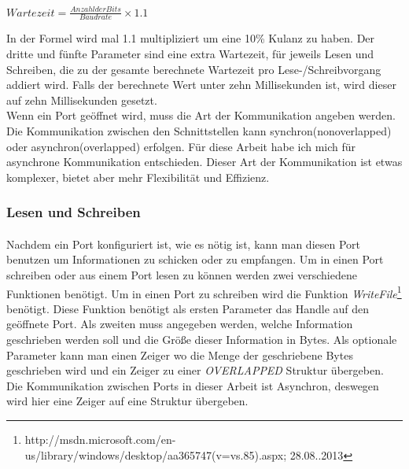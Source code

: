 \begin{center}
$ Wartezeit = \frac{Anzahl der Bits}{Baudrate} \times 1.1$
\end{center}

In der Formel wird mal 1.1 multipliziert um eine 10\% Kulanz zu haben. Der dritte und fünfte Parameter sind eine extra Wartezeit, für jeweils Lesen und Schreiben, die zu der gesamte berechnete Wartezeit pro Lese-/Schreibvorgang addiert wird. Falls der berechnete Wert unter zehn Millisekunden ist, wird dieser auf zehn Millisekunden gesetzt.
\\

Wenn ein Port geöffnet wird, muss die Art der Kommunikation angeben werden. Die Kommunikation zwischen den Schnittstellen kann synchron(nonoverlapped) oder asynchron(overlapped) erfolgen. Für diese Arbeit habe ich mich für asynchrone Kommunikation entschieden. Dieser Art der Kommunikation ist etwas komplexer, bietet aber mehr Flexibilität und Effizienz.



\subsubsection{Lesen und Schreiben}
\paragraph{}
Nachdem ein Port konfiguriert ist, wie es nötig ist, kann man diesen Port benutzen um Informationen zu schicken oder zu empfangen. Um in einen Port schreiben oder aus einem Port lesen zu können  werden zwei verschiedene Funktionen benötigt. Um in einen Port zu schreiben wird die Funktion \textit{WriteFile}\footnote{http://msdn.microsoft.com/en-us/library/windows/desktop/aa365747(v=vs.85).aspx; 28.08..2013} benötigt. Diese Funktion benötigt als ersten Parameter das Handle auf den geöffnete Port. Als zweiten muss angegeben werden, welche Information geschrieben werden soll und die Größe dieser Information in Bytes. Als optionale Parameter kann man einen Zeiger wo die Menge der geschriebene Bytes geschrieben wird und ein Zeiger zu einer \textit{OVERLAPPED} Struktur übergeben. Die Kommunikation zwischen Ports in dieser Arbeit ist Asynchron, deswegen wird hier eine Zeiger auf eine Struktur übergeben.
\\

